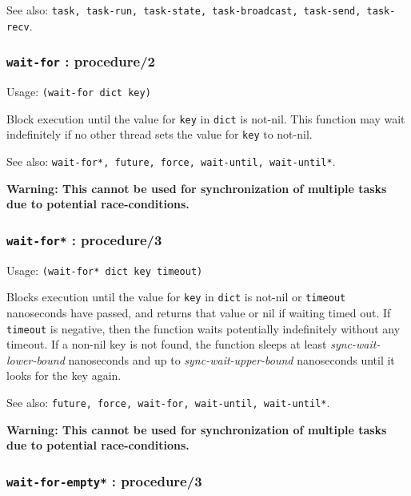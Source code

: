 \documentclass[
]{article}
\newcommand{\passthrough}[1]{#1}
\begin{document}
See also:
\passthrough{\lstinline!task, task-run, task-state, task-broadcast, task-send, task-recv!}.

\hypertarget{wait-for-procedure2}{%
\subsubsection{\texorpdfstring{\texttt{wait-for} :
procedure/2}{wait-for : procedure/2}}\label{wait-for-procedure2}}

Usage: \passthrough{\lstinline!(wait-for dict key)!}

Block execution until the value for \passthrough{\lstinline!key!} in
\passthrough{\lstinline!dict!} is not-nil. This function may wait
indefinitely if no other thread sets the value for
\passthrough{\lstinline!key!} to not-nil.

See also:
\passthrough{\lstinline!wait-for*, future, force, wait-until, wait-until*!}.

\textbf{Warning: This cannot be used for synchronization of multiple
tasks due to potential race-conditions.}

\hypertarget{wait-for-procedure3}{%
\subsubsection{\texorpdfstring{\texttt{wait-for*} :
procedure/3}{wait-for* : procedure/3}}\label{wait-for-procedure3}}

Usage: \passthrough{\lstinline!(wait-for* dict key timeout)!}

Blocks execution until the value for \passthrough{\lstinline!key!} in
\passthrough{\lstinline!dict!} is not-nil or
\passthrough{\lstinline!timeout!} nanoseconds have passed, and returns
that value or nil if waiting timed out. If
\passthrough{\lstinline!timeout!} is negative, then the function waits
potentially indefinitely without any timeout. If a non-nil key is not
found, the function sleeps at least \emph{sync-wait-lower-bound}
nanoseconds and up to \emph{sync-wait-upper-bound} nanoseconds until it
looks for the key again.

See also:
\passthrough{\lstinline!future, force, wait-for, wait-until, wait-until*!}.

\textbf{Warning: This cannot be used for synchronization of multiple
tasks due to potential race-conditions.}

\hypertarget{wait-for-empty-procedure3}{%
\subsubsection{\texorpdfstring{\texttt{wait-for-empty*} :
procedure/3}{wait-for-empty* : procedure/3}}\label{wait-for-empty-procedure3}}
\end{document}
